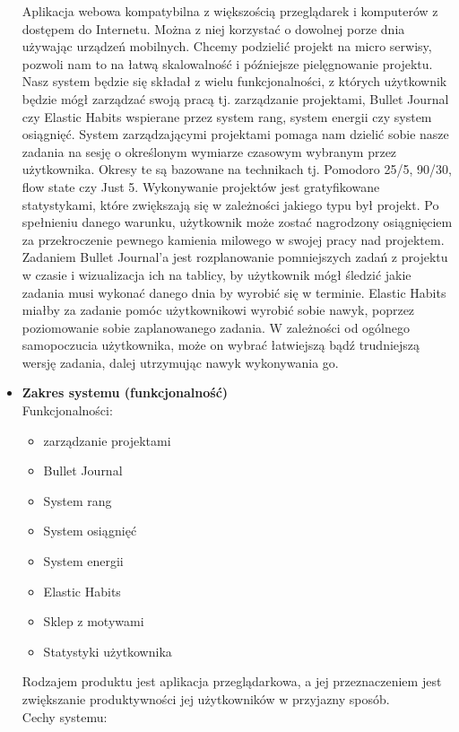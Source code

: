 \documentclass[a4paper,11pt]{report}
\begin{document}
\begin{itemize}
	Aplikacja webowa kompatybilna z większością przeglądarek i komputerów z dostępem do Internetu. Można z niej korzystać o dowolnej porze dnia używając urządzeń mobilnych. Chcemy podzielić projekt na micro serwisy, pozwoli nam to na łatwą skalowalność i późniejsze pielęgnowanie projektu. Nasz system będzie się składał z wielu funkcjonalności, z których użytkownik będzie mógł zarządzać swoją pracą tj. zarządzanie projektami, Bullet Journal czy Elastic Habits\cite{elastic} wspierane przez system rang, system energii czy system osiągnięć. System zarządzającymi projektami pomaga nam dzielić sobie nasze zadania na sesję o określonym wymiarze czasowym wybranym przez użytkownika. Okresy te są bazowane na technikach tj. Pomodoro 25/5\cite{Pomodoro}, 90/30\cite{90/30}, flow state\cite{flow} czy Just 5\cite{just5}. Wykonywanie projektów jest gratyfikowane statystykami, które zwiększają się w zależności jakiego typu był projekt. Po spełnieniu danego warunku, użytkownik może zostać nagrodzony osiągnięciem za przekroczenie pewnego kamienia milowego w swojej pracy nad projektem. Zadaniem Bullet Journal’a jest rozplanowanie pomniejszych zadań z projektu w czasie i wizualizacja ich na tablicy, by użytkownik mógł śledzić jakie zadania musi wykonać danego dnia by wyrobić się w terminie. Elastic Habits miałby za zadanie pomóc użytkownikowi wyrobić sobie nawyk, poprzez poziomowanie sobie zaplanowanego zadania. W zależności od ogólnego samopoczucia użytkownika, może on wybrać łatwiejszą bądź trudniejszą wersję zadania, dalej utrzymując nawyk wykonywania go. \\
	\item \textbf{Zakres systemu (funkcjonalność)}\\
	Funkcjonalności:
	\begin{itemize}
		\item zarządzanie projektami
		\item Bullet Journal 
		\item System rang
		\item System osiągnięć
		\item System energii
		\item Elastic Habits
		\item Sklep z motywami
		\item Statystyki użytkownika
	\end{itemize}
Rodzajem produktu jest aplikacja przeglądarkowa, a jej przeznaczeniem jest zwiększanie produktywności jej użytkowników w przyjazny sposób.\\
Cechy systemu:
	\begin{itemize}

\end{itemize}
\end{itemize}
\end{document}
